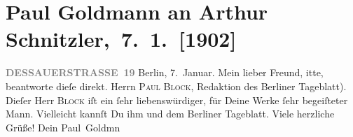 

         
         \renewcommand{\erwaehntePersonen}{Personen: Paul Block}
         \renewcommand{\erwaehnteInstitutionen}{Institutionen: Berliner Tageblatt}
         \renewcommand{\erwaehnteOrte}{Orte: Berlin, Dessauer Straße, Wien}
         \renewcommand{\erwaehnteWerke}{}
               \section[ Paul Goldmann an Arthur Schnitzler, 7. 1. {[}1902{]}]{ Paul Goldmann an Arthur Schnitzler, 7. 1. {[}1902{]}}\nopagebreak{}\rehead{ }\begin{ledgroupsized}[t]{13cm}\normalsize\beginnumbering \toendnotes[C]{\smallbreak\pagebreak[2]} 
\toendnotes[C]{\smallbreak}\pstart
           \noindent{}\raggedleft{}{\pb}\textcolor{gray}{\textbf{DESSAUERSTRASSE 19}}\pend
           \pstart
           Berlin, 7. Januar.\pend
           \pstart\center{}Mein lieber Freund,\pend\pstart
           itte, beantworte dieſe \label{K_L03191-1v}\label{K_L03191-1h}
               direkt. \damage{(}Herrn \textsc{Paul Block}, Redaktion des Berliner Tageblatt).  Dieſer Herr \textsc{Block} iſt ein ſehr liebenswürdiger, für Deine Werke ſehr begeiſteter Mann. Vielleicht
               kannſt Du ihm und dem Berliner Tageblatt\label{K_L03191-2v}\label{K_L03191-2h}. Viele herzliche Grüße! Dein \spacefill\mbox{Paul
                  Goldmn}\pend
           
         
         \endnumbering{}\end{ledgroupsized}  \newcommand{\dateiname}{L03191}\newcommand{\titel}{Paul Goldmann an Arthur Schnitzler, 7. 1. [1902]}\newcommand{\editorInnen}{Martin Anton Müller und Laura Untner}
      